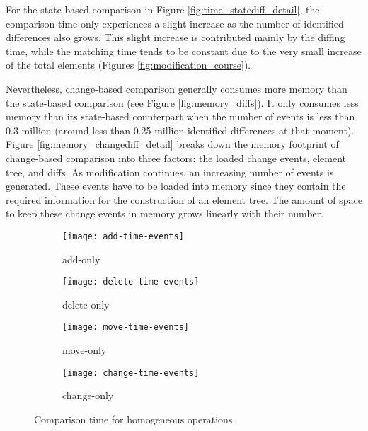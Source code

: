 For the state-based comparison in Figure \ref{fig:time_statediff_detail}, the comparison time only experiences a slight increase as the number of identified differences also grows.
This slight increase is contributed mainly by the diffing time, while the matching time tends to be constant due to the very small increase of the total elements (Figures \ref{fig:modification_course}).

Nevertheless, change-based comparison generally consumes more memory than the state-based comparison (see Figure \ref{fig:memory_diffs}). It only consumes less memory than its state-based counterpart when the number of events is less than 0.3 million (around less than 0.25 million identified differences at that moment). Figure \ref{fig:memory_changediff_detail} breaks down the memory footprint of change-based comparison into three factors: the loaded change events, element tree, and diffs. As modification continues, an increasing number of events is generated. These events have to be loaded into memory since they contain the required information for the construction of an element tree. The amount of space to keep these change events in memory grows linearly with their number. 

\begin{figure}[ht]
  \centering
  \begin{subfigure}[t]{0.495\linewidth}
    \texttt{[image: add-time-events]}
    \caption{add-only}
    \label{fig:add-time-events}
  \end{subfigure}
  \hfill
  \begin{subfigure}[t]{0.495\linewidth}
    \texttt{[image: delete-time-events]}
    \caption{delete-only}
    \label{fig:delete-time-events}
  \end{subfigure}
  \begin{subfigure}[t]{0.495\linewidth}
    \texttt{[image: move-time-events]}
    \caption{move-only}
    \label{fig:move-time-events}
  \end{subfigure}
  \hfill
  \begin{subfigure}[t]{0.495\linewidth}
    \texttt{[image: change-time-events]}
    \caption{change-only}
    \label{fig:change-time-events}
  \end{subfigure}
  \caption{Comparison time for homogeneous operations.}
  \label{fig:operation_time_events}
\end{figure}

